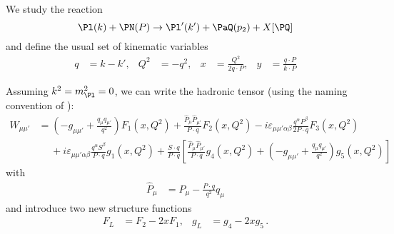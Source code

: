 
We study the reaction
\begin{equation}
\Pl(k) + \PN(P) \to \Pl'(k') + \PaQ(p_2) + X[\PQ]
\end{equation}
and define the usual set of kinematic variables
\begin{align}
q &= k - k', &Q^2 &= -q^2, &x &= \frac{Q^2}{2q\cdot P}, &y &= \frac{q\cdot P}{k\cdot P}
\end{align}

Assuming $k^2 = m_{\Pl}^2 = 0$, we can write the hadronic tensor (using the naming convention of \cite{Patrignani:2016xqp}):
\begin{align}
W_{\mu\mu'} &= (-g_{\mu\mu'} + \frac{q_\mu q_{\mu'}}{q^2}) F_1(x,Q^2) + \frac{\hat P_\mu \hat P_{\mu'}}{P\cdot q} F_2(x,Q^2) - i\varepsilon_{\mu\mu'\alpha\beta} \frac{q^\alpha P^\beta}{2P\cdot q} F_3(x,Q^2) \nonumber\\
 &\hspace{15pt} + i\varepsilon_{\mu\mu'\alpha\beta} \frac{q^\alpha S^\beta}{P\cdot q} g_1(x,Q^2) + \frac{S\cdot q}{P\cdot q}\left[\frac{\hat P_\mu \hat P_{\mu'}}{P\cdot q} g_4(x,Q^2) + (-g_{\mu\mu'} + \frac{q_\mu q_{\mu'}}{q^2}) g_5(x,Q^2)\right] \label{eq:HadroTen}
\end{align}
with
\begin{align}
\hat P_\mu &= P_\mu - \frac{P\cdot q}{q^2}q_\mu
\end{align}
and introduce two new structure functions
\begin{align}
F_L &= F_2 - 2xF_1, &g_L &= g_4 - 2xg_5\,.
\end{align}

